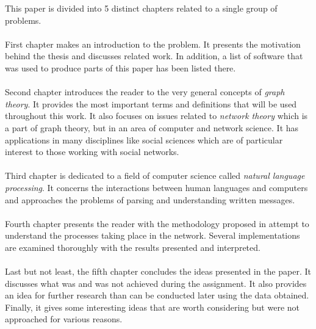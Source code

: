     This paper is divided into 5 distinct chapters related to a single group of problems.
    \\\\
    First chapter makes an introduction to the problem. It presents the motivation behind the thesis and discusses related work. In addition, a list of software that was used to produce parts of this paper has been listed there.
    \\\\
    Second chapter introduces the reader to the very general concepts of \emph{graph theory}. It provides the most important terms and definitions that will be used throughout this work. It also focuses on issues related to \emph{network theory} which is a part of graph theory, but in an area of computer and network science. It has applications in many disciplines like social sciences which are of particular interest to those working with social networks.
    \\\\
    Third chapter is dedicated to a field of computer science called \emph{natural language processing}. It concerns the interactions between human languages and computers and approaches the problems of parsing and understanding written messages.
    \\\\
    Fourth chapter presents the reader with the methodology proposed in attempt to understand the processes taking place in the network. Several implementations are examined thoroughly with the results presented and interpreted.
    \\\\
    Last but not least, the fifth chapter concludes the ideas presented in the paper. It discusses what was and was not achieved during the assignment. It also provides an idea for further research than can be conducted later using the data obtained. Finally, it gives some interesting ideas that are worth considering but were not approached for various reasons.